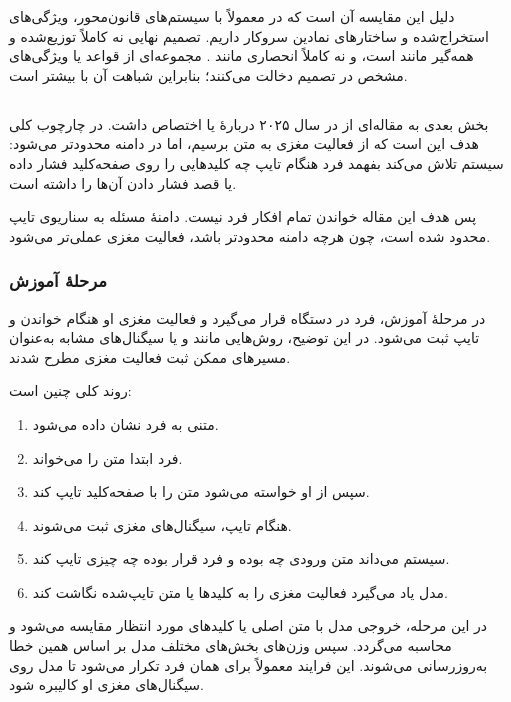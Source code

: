 دلیل این مقایسه آن است که در  معمولاً با سیستم‌های قانون‌محور، ویژگی‌های استخراج‌شده و ساختارهای نمادین سروکار داریم. تصمیم نهایی نه کاملاً توزیع‌شده و همه‌گیر مانند  است، و نه کاملاً انحصاری مانند . مجموعه‌ای از قواعد یا ویژگی‌های مشخص در تصمیم دخالت می‌کنند؛ بنابراین شباهت آن با  بیشتر است.

\subsection{}
بخش بعدی به مقاله‌ای از  در سال ۲۰۲۵ دربارهٔ  یا  اختصاص داشت. در چارچوب کلی  هدف این است که از فعالیت مغزی به متن برسیم، اما در  دامنه محدودتر می‌شود: سیستم تلاش می‌کند بفهمد فرد هنگام تایپ چه کلیدهایی را روی صفحه‌کلید  فشار داده یا قصد فشار دادن آن‌ها را داشته است.

پس هدف این مقاله خواندن تمام افکار فرد نیست. دامنهٔ مسئله به سناریوی تایپ محدود شده است، چون هرچه دامنه محدودتر باشد،  فعالیت مغزی عملی‌تر می‌شود.

\subsubsection{مرحلهٔ آموزش}
در مرحلهٔ آموزش، فرد در دستگاه قرار می‌گیرد و فعالیت مغزی او هنگام خواندن و تایپ ثبت می‌شود. در این توضیح، روش‌هایی مانند  و  یا سیگنال‌های مشابه به‌عنوان مسیرهای ممکن ثبت فعالیت مغزی مطرح شدند.

روند کلی چنین است:

\begin{enumerate}
  \item متنی به فرد نشان داده می‌شود.
  \item فرد ابتدا متن را می‌خواند.
  \item سپس از او خواسته می‌شود متن را با صفحه‌کلید  تایپ کند.
  \item هنگام تایپ، سیگنال‌های مغزی ثبت می‌شوند.
  \item سیستم می‌داند متن ورودی چه بوده و فرد قرار بوده چه چیزی تایپ کند.
  \item مدل یاد می‌گیرد فعالیت مغزی را به کلیدها یا متن تایپ‌شده نگاشت کند.
\end{enumerate}

در این مرحله، خروجی مدل با متن اصلی یا کلیدهای مورد انتظار مقایسه می‌شود و  محاسبه می‌گردد. سپس وزن‌های بخش‌های مختلف مدل بر اساس همین خطا به‌روزرسانی می‌شوند. این فرایند معمولاً برای همان فرد تکرار می‌شود تا مدل روی سیگنال‌های مغزی او کالیبره شود.


